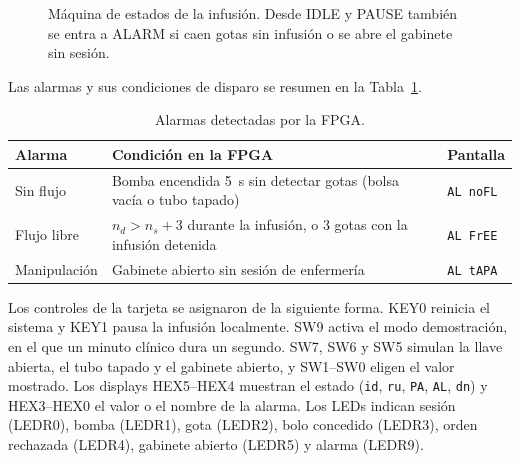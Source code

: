 \documentclass[11pt,letterpaper]{article}
\newcommand{\code}[1]{\texttt{#1}}
\begin{document}
\begin{figure}[H]
\centering
{}
\caption{Máquina de estados de la infusión. Desde IDLE y PAUSE también se entra a ALARM si caen gotas sin infusión o se abre el gabinete sin sesión.}
\label{fig:fsm}
\end{figure}

Las alarmas y sus condiciones de disparo se resumen en la Tabla~\ref{tab:alarmas}.

\begin{table}[H]
\centering
\caption{Alarmas detectadas por la FPGA.}
\label{tab:alarmas}
\begin{tabularx}{\linewidth}{lXl}
\toprule
\textbf{Alarma} & \textbf{Condición en la FPGA} & \textbf{Pantalla} \\
\midrule
Sin flujo & Bomba encendida 5~s sin detectar gotas (bolsa vacía o tubo tapado) & \code{AL noFL} \\
Flujo libre & $n_d > n_s + 3$ durante la infusión, o 3 gotas con la infusión detenida & \code{AL FrEE} \\
Manipulación & Gabinete abierto sin sesión de enfermería & \code{AL tAPA} \\
\bottomrule
\end{tabularx}
\end{table}

Los controles de la tarjeta se asignaron de la siguiente forma. KEY0 reinicia el sistema y KEY1 pausa la infusión localmente. SW9 activa el modo demostración, en el que un minuto clínico dura un segundo. SW7, SW6 y SW5 simulan la llave abierta, el tubo tapado y el gabinete abierto, y SW1--SW0 eligen el valor mostrado. Los displays HEX5--HEX4 muestran el estado (\code{id}, \code{ru}, \code{PA}, \code{AL}, \code{dn}) y HEX3--HEX0 el valor o el nombre de la alarma. Los LEDs indican sesión (LEDR0), bomba (LEDR1), gota (LEDR2), bolo concedido (LEDR3), orden rechazada (LEDR4), gabinete abierto (LEDR5) y alarma (LEDR9).
\end{document}
